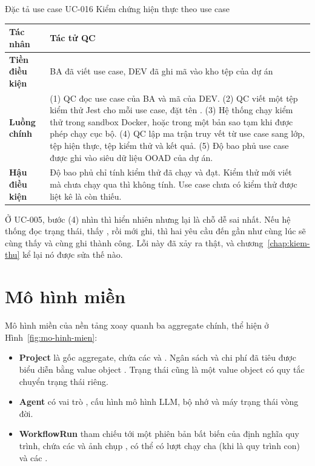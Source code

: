 \begin{table}{Đặc tả use case UC-016 Kiểm chứng hiện thực theo use case}
\label{tab:uc016}
\small
\begin{tabularx}{\textwidth}{|P{2.8cm}|L|}
\hline
\textbf{Tác nhân} & Tác tử QC \\ \hline
\textbf{Tiền điều kiện} & BA đã viết use case, DEV đã ghi mã vào kho tệp của dự án \\ \hline
\textbf{Luồng chính} &
(1) QC đọc use case của BA và mã của DEV.
(2) QC viết một tệp kiểm thử Jest cho mỗi use case, đặt tên .
(3) Hệ thống chạy kiểm thử trong sandbox Docker, hoặc trong một bản sao tạm khi được phép chạy cục bộ.
(4) QC lập ma trận truy vết từ use case sang lớp, tệp hiện thực, tệp kiểm thử và kết quả.
(5) Độ bao phủ use case được ghi vào siêu dữ liệu OOAD của dự án. \\ \hline
\textbf{Hậu điều kiện} & Độ bao phủ chỉ tính kiểm thử đã chạy và đạt. Kiểm thử mới viết mà chưa chạy qua thì không tính. Use case chưa có kiểm thử được liệt kê là còn thiếu. \\ \hline
\end{tabularx}
\end{table}

Ở UC-005, bước (4) nhìn thì hiển nhiên nhưng lại là chỗ dễ sai nhất. Nếu hệ thống đọc trạng thái, thấy , rồi mới ghi, thì hai yêu cầu đến gần như cùng lúc sẽ cùng thấy  và cùng ghi thành công. Lỗi này đã xảy ra thật, và chương~\ref{chap:kiem-thu} kể lại nó được sửa thế nào.

\section{Mô hình miền}

Mô hình miền của nền tảng xoay quanh ba aggregate chính, thể hiện ở Hình~\ref{fig:mo-hinh-mien}:

\begin{itemize}
\item \textbf{Project} là gốc aggregate, chứa các  và . Ngân sách và chi phí đã tiêu được biểu diễn bằng value object . Trạng thái  cũng là một value object có quy tắc chuyển trạng thái riêng.
\item \textbf{Agent} có vai trò , cấu hình mô hình LLM, bộ nhớ  và máy trạng thái vòng đời.
\item \textbf{WorkflowRun} tham chiếu tới một phiên bản bất biến của định nghĩa quy trình, chứa các  và ảnh chụp , có thể có lượt chạy cha (khi là quy trình con) và các .
\end{itemize}

